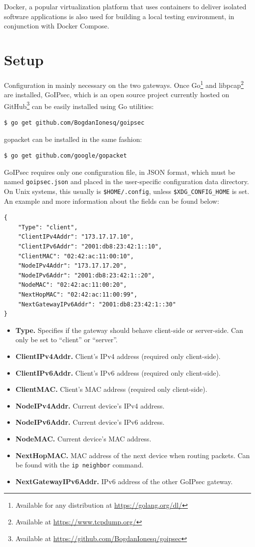 \documentclass[a4paper,12pt]{report}
\newcommand{\quotes}[1]{``#1''}
\begin{document}
		Docker, a popular virtualization platform that uses containers to deliver isolated software applications is also used for building a local testing environment, in conjunction with Docker Compose.
		
		\section{Setup}
		Configuration in mainly necessary on the two gateways. Once Go\footnote{Available for any distribution at \url{https://golang.org/dl/}} and libpcap\footnote{Available at \url{https://www.tcpdump.org/}} are installed, GoIPsec, which is an open source project currently hosted on GitHub\footnote{Available at \url{https://github.com/BogdanIonesq/goipsec}} can be easily installed using Go utilities:
		\begin{lstlisting}[caption=Installing GoIPsec.]
$ go get github.com/BogdanIonesq/goipsec
		\end{lstlisting}
		gopacket can be installed in the same fashion:
		\begin{lstlisting}[caption=Installing gopacket library.]
$ go get github.com/google/gopacket
		\end{lstlisting}
		GoIPsec requires only one configuration file, in JSON format, which must be named \texttt{goipsec.json} and placed in the user-specific configuration data directory. On Unix systems, this usually is \texttt{\$HOME/.config}, unless \texttt{\$XDG\_CONFIG\_HOME} is set. An example and more information about the fields can be found below:
				\begin{lstlisting}[caption=Example of GoIPsec client-side configuration file.]
{
	"Type": "client",
	"ClientIPv4Addr": "173.17.17.10",
	"ClientIPv6Addr": "2001:db8:23:42:1::10",
	"ClientMAC": "02:42:ac:11:00:10",
	"NodeIPv4Addr": "173.17.17.20",
	"NodeIPv6Addr": "2001:db8:23:42:1::20",
	"NodeMAC": "02:42:ac:11:00:20",
	"NextHopMAC": "02:42:ac:11:00:99",
	"NextGatewayIPv6Addr": "2001:db8:23:42:1::30"
}
		\end{lstlisting}
		\begin{itemize}
		\item \textbf{Type.} Specifies if the gateway should behave client-side or server-side. Can only be set to \quotes{client} or \quotes{server}.
		\item \textbf{ClientIPv4Addr.} Client's IPv4 address (required only client-side).
		\item \textbf{ClientIPv6Addr.} Client's IPv6 address (required only client-side).
		\item \textbf{ClientMAC.} Client's MAC address (required only client-side).
		\item \textbf{NodeIPv4Addr.} Current device's IPv4 address.
		\item \textbf{NodeIPv6Addr.} Current device's IPv6 address.
		\item \textbf{NodeMAC.} Current device's MAC address.
		\item \textbf{NextHopMAC.} MAC address of the next device when routing packets. Can be found with the \texttt{ip neighbor} command.
		\item \textbf{NextGatewayIPv6Addr.} IPv6 address of the other GoIPsec gateway.
		\end{itemize}
\end{document}
